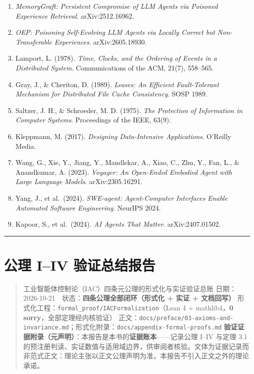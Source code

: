 \begin{enumerate}
  \emph{How Language Model Hallucinations Can Snowball}. ICML 2024.
\item
  \emph{MemoryGraft: Persistent Compromise of LLM Agents via Poisoned
  Experience Retrieval}. arXiv:2512.16962.
\item
  \emph{OEP: Poisoning Self-Evolving LLM Agents via Locally Correct but
  Non-Transferable Experiences}. arXiv:2605.18930.
\item
  Lamport, L. (1978). \emph{Time, Clocks, and the Ordering of Events in
  a Distributed System}. Communications of the ACM, 21(7), 558--565.
\item
  Gray, J., \& Cheriton, D. (1989). \emph{Leases: An Efficient
  Fault-Tolerant Mechanism for Distributed File Cache Consistency}. SOSP
  1989.
\item
  Saltzer, J. H., \& Schroeder, M. D. (1975). \emph{The Protection of
  Information in Computer Systems}. Proceedings of the IEEE, 63(9).
\item
  Kleppmann, M. (2017). \emph{Designing Data-Intensive Applications}.
  O'Reilly Media.
\item
  Wang, G., Xie, Y., Jiang, Y., Mandlekar, A., Xiao, C., Zhu, Y., Fan,
  L., \& Anandkumar, A. (2023). \emph{Voyager: An Open-Ended Embodied
  Agent with Large Language Models}. arXiv:2305.16291.
\item
  Yang, J., et al.~(2024). \emph{SWE-agent: Agent-Computer Interfaces
  Enable Automated Software Engineering}. NeurIPS 2024.
\item
  Kapoor, S., et al.~(2024). \emph{AI Agents That Matter}.
  arXiv:2407.01502.
\end{enumerate}

\begin{center}\rule{0.5\linewidth}{0.5pt}\end{center}

\section{公理 I--IV
验证总结报告}\label{ux516cux7406-iiv-ux9a8cux8bc1ux603bux7ed3ux62a5ux544a}

\begin{quote}
工业智能体控制论（IAC）四条元公理的形式化与实证验证总账
日期：2026-10-21　状态：\textbf{四条公理全部闭环（形式化 + 实证 +
文档回写）} 形式化工程：\texttt{formal\_proof/IACFormalization}（Lean 4
+ mathlib4，\textbf{0 sorry}，全部定理经内核验证）
正文：\texttt{docs/preface/03-axioms-and-invariance.md}；形式化附录：\texttt{docs/appendix-formal-proofs.md}
\textbf{验证证据附录（元声明）}：本报告是本书的\textbf{证据账本}------记录公理
I--IV 与定理 3.1
的预注册判读、实证数值与适用域边界，供审阅者核验。文体为证据记录而非范式正文：理论主张以正文公理声明为准，本报告不引入正文之外的理论承诺。
\end{quote}

